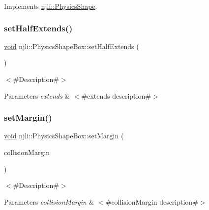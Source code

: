 Implements \mbox{\hyperlink{classnjli_1_1_physics_shape_a441e82a42f3b588a409c3b6c41288abd}{njli\+::\+Physics\+Shape}}.

\mbox{\label{classnjli_1_1_physics_shape_box_a25c10d3f2ecac19728eb1696f566bd91}} 
\subsubsection{\texorpdfstring{set\+Half\+Extends()}{setHalfExtends()}}
{\footnotesize\ttfamily \mbox{\hyperlink{_thread_8h_af1e856da2e658414cb2456cb6f7ebc66}{void}} njli\+::\+Physics\+Shape\+Box\+::set\+Half\+Extends (\begin{DoxyParamCaption}\item[{const bt\+Vector3 \&}]{ }\end{DoxyParamCaption})}

$<$\#\+Description\#$>$


\begin{DoxyParams}{Parameters}
{\em extends} & $<$\#extends description\#$>$ \\
\hline
\end{DoxyParams}
\mbox{\label{classnjli_1_1_physics_shape_box_a44141f2092a02d14d8b3d1036c53b709}} 
\subsubsection{\texorpdfstring{set\+Margin()}{setMargin()}}
{\footnotesize\ttfamily \mbox{\hyperlink{_thread_8h_af1e856da2e658414cb2456cb6f7ebc66}{void}} njli\+::\+Physics\+Shape\+Box\+::set\+Margin (\begin{DoxyParamCaption}\item[{bt\+Scalar}]{collision\+Margin }\end{DoxyParamCaption})}

$<$\#\+Description\#$>$


\begin{DoxyParams}{Parameters}
{\em collision\+Margin} & $<$\#collision\+Margin description\#$>$ \\
\hline
\end{DoxyParams}
\mbox{\label{classnjli_1_1_physics_shape_box_ae95550307295d398f96489183c27f8f1}} 
